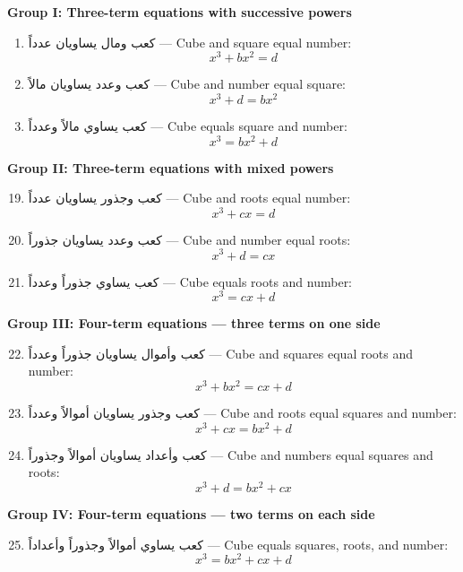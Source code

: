 \documentclass[11pt,a4paper]{book}
\begin{document}
\begin{propositionbox}

\textbf{Group I: Three-term equations with successive powers}

\begin{enumerate}[label=\arabic*.,resume,noitemsep]
\item \textarabic{كعب ومال يساويان عدداً} --- Cube and square equal number:    $$x^3 + b x^2 = d$$
\item \textarabic{كعب وعدد يساويان مالاً} --- Cube and number equal square:    $$x^3 + d = b x^2$$
\item \textarabic{كعب يساوي مالاً وعدداً} --- Cube equals square and number:    $$x^3 = b x^2 + d$$
\end{enumerate}

\textbf{Group II: Three-term equations with mixed powers}

\begin{enumerate}[label=\arabic*.,resume,noitemsep]    
\setcounter{enumi}{18}
\item \textarabic{كعب وجذور يساويان عدداً} --- Cube and roots equal number:    $$x^3 + c x = d$$
\item \textarabic{كعب وعدد يساويان جذوراً} --- Cube and number equal roots:    $$x^3 + d = c x$$
\item \textarabic{كعب يساوي جذوراً وعدداً} --- Cube equals roots and number:    $$x^3 = c x + d$$
\end{enumerate}

\textbf{Group III: Four-term equations --- three terms on one side}

\begin{enumerate}[label=\arabic*.,resume,noitemsep]    
\setcounter{enumi}{21}
\item \textarabic{كعب وأموال يساويان جذوراً وعدداً} --- Cube and squares equal roots and number:    $$x^3 + b x^2 = c x + d$$
\item \textarabic{كعب وجذور يساويان أموالاً وعدداً} --- Cube and roots equal squares and number:    $$x^3 + c x = b x^2 + d$$
\item \textarabic{كعب وأعداد يساويان أموالاً وجذوراً} --- Cube and numbers equal squares and roots:    $$x^3 + d = b x^2 + c x$$
\end{enumerate}

\textbf{Group IV: Four-term equations --- two terms on each side}

\begin{enumerate}[label=\arabic*.,resume,noitemsep]    
\setcounter{enumi}{24}
\item \textarabic{كعب يساوي أموالاً وجذوراً وأعداداً} --- Cube equals squares, roots, and number:    $$x^3 = b x^2 + c x + d$$
\end{enumerate}

\end{propositionbox}
\end{document}
